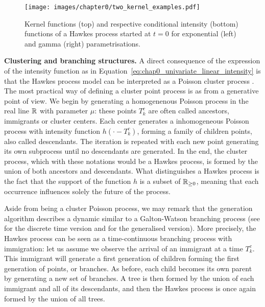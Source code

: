     \begin{figure}[!ht]
        \centering
          \texttt{[image: images/chapter0/two\_kernel\_examples.pdf]}
        \caption{Kernel functions (top) and respective conditional intensity (bottom) functions of a Hawkes process started at $t=0$ for exponential (left) and gamma (right) parametrisations.
        }
        \label{fig:chap0_two_kernel_examples}
      \end{figure}

    \textbf{Clustering and branching structures.}
    A direct consequence of the expression of the intensity function as in Equation~\eqref{eq:chap0_univariate_linear_intensity} is that the Hawkes process model can be interpreted as a Poisson cluster process \parencite{Hawkes1974}.
    The most practical way of defining a cluster point process is as from a generative point of view.
    We begin by generating a homogenenous Poisson process in the real line ${\mathbb R}$ with parameter $\mu$: these points $T_k^c$ are often called ancestors, immigrants or cluster centers.
    Each center generates a inhomogeneous Poisson process with intensity function $h(\cdot - T_k^c)$, forming a family of children points, also called descendants.
    The iteration is repeated with each new point generating its own subprocess until no descendants are generated.
    In the end, the cluster process, which with these notations would be a Hawkes process, is formed by the union of both ancestors and descendants.
    What distinguishes a Hawkes process is the fact that the support of the function $h$ is a subset of ${\mathbb R}_{\geq0}$, meaning that each occurrence influences solely the future of the process.


    Aside from being a cluster Poisson process, we may remark that the generation algorithm describes a dynamic similar to a Galton-Watson branching process (see \textcite{Watson1875} for the discrete time version and \textcite[Chapter III]{Harris02} for the generalised version).
    More precisely, the Hawkes process can be seen as a time-continuous branching process with immigration:
    let us assume we observe the arrival of an immigrant at a time $T_k^c$.
    This immigrant will generate a first generation of children forming the first generation of points, or branches.
    As before, each child becomes its own parent by generating a new set of branches.
    A tree is then formed by the union of each immigrant and all of its descendants, and then the Hawkes process is once again formed by the union of all trees.

